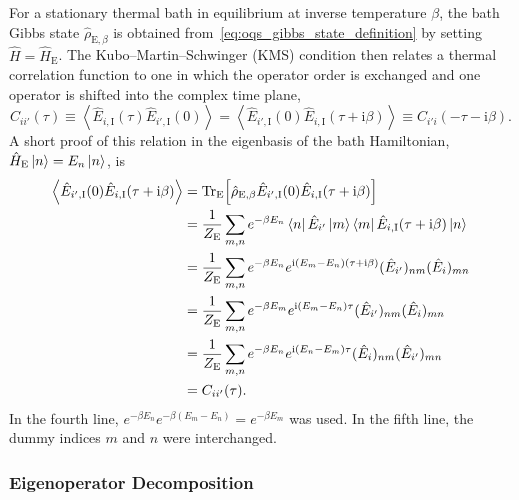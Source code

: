 For a stationary thermal bath in equilibrium at inverse temperature \(\beta\), the bath Gibbs state \(\hat{\rho}_{\mathrm{E},\beta}\) is obtained from~\autoref{eq:oqs_gibbs_state_definition} by setting \(\hat{H}=\hat{H}_{\mathrm{E}}\). The Kubo--Martin--Schwinger (KMS) condition then relates a thermal correlation function to one in which the operator order is exchanged and one operator is shifted into the complex time plane,
\begin{equation}
	C_{ii'}(\tau)
	\equiv
	\left\langle
	\hat{E}_{i,\mathrm{I}}(\tau)\hat{E}_{i',\mathrm{I}}(0)
	\right\rangle
	=
	\left\langle
	\hat{E}_{i',\mathrm{I}}(0)\hat{E}_{i,\mathrm{I}}(\tau+\mathrm{i}\beta)
	\right\rangle
	\equiv
	C_{i'i}(-\tau-\mathrm{i}\beta).
	\label{eq:oqs_kms_time_relation}
\end{equation}
A short proof of this relation in the eigenbasis of the bath Hamiltonian, \(\hat{H}_{\mathrm{E}}\ket{n}=E_n\ket{n}\), is
\begin{align*}
	\left\langle
	\hat{E}_{i',\mathrm{I}}(0)\hat{E}_{i,\mathrm{I}}(\tau+\mathrm{i}\beta)
	\right\rangle
	&=
	\mathrm{Tr}_{\mathrm{E}}\!\left[
	\hat{\rho}_{\mathrm{E},\beta}
	\hat{E}_{i',\mathrm{I}}(0)
	\hat{E}_{i,\mathrm{I}}(\tau+\mathrm{i}\beta)
	\right] \\
	&=
	\frac{1}{Z_{\mathrm{E}}}
	\sum_{m,n}
	e^{-\beta E_n}
	\bra{n}\hat{E}_{i'}\ket{m}
	\bra{m}\hat{E}_{i,\mathrm{I}}(\tau+\mathrm{i}\beta)\ket{n} \\
	&=
	\frac{1}{Z_{\mathrm{E}}}
	\sum_{m,n}
	e^{-\beta E_n}
	e^{\mathrm{i}(E_m-E_n)(\tau+\mathrm{i}\beta)}
	(\hat{E}_{i'})_{nm}
	(\hat{E}_{i})_{mn} \\
	&=
	\frac{1}{Z_{\mathrm{E}}}
	\sum_{m,n}
	e^{-\beta E_m}
	e^{\mathrm{i}(E_m-E_n)\tau}
	(\hat{E}_{i'})_{nm}
	(\hat{E}_{i})_{mn} \\
	&=
	\frac{1}{Z_{\mathrm{E}}}
	\sum_{m,n}
	e^{-\beta E_n}
	e^{\mathrm{i}(E_n-E_m)\tau}
	(\hat{E}_{i})_{nm}
	(\hat{E}_{i'})_{mn} \\
	&=
	C_{ii'}(\tau).
\end{align*}
In the fourth line, \(e^{-\beta E_n}e^{-\beta(E_m-E_n)}=e^{-\beta E_m}\) was used. In the fifth line, the dummy indices \(m\) and \(n\) were interchanged.


\subsubsection{Eigenoperator Decomposition}

